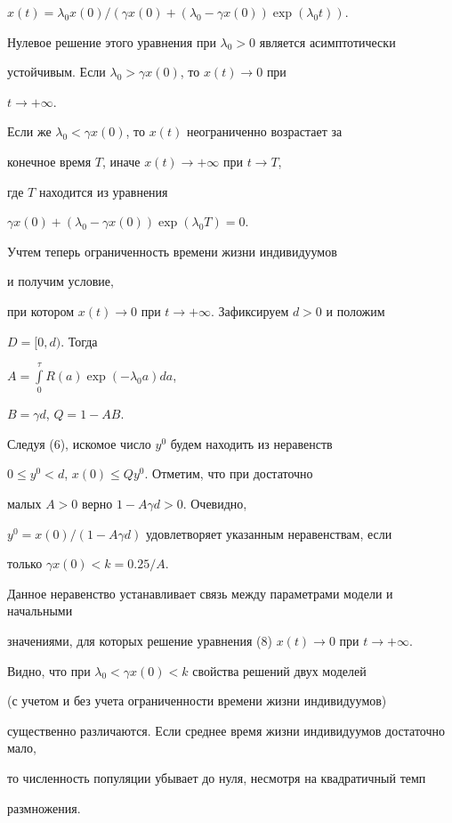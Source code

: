 $x(t)= \lambda_0 x(0)/(\gamma x(0) + (\lambda_0 - \gamma x(0))


\exp(\lambda_0 t))$.


Нулевое решение этого уравнения при $\lambda_0 > 0$ является асимптотически


устойчивым. Если $\lambda_0 > \gamma x(0)$, то $x(t) \to 0$ при


$t \to +\infty$.


Если же $\lambda_0 < \gamma x(0)$, то $x(t)$ неограниченно возрастает за


конечное время $T$, иначе $x(t) \to +\infty$ при $t \to T$,


где $T$ находится из уравнения


$\gamma x(0) + (\lambda_0 - \gamma x(0)) \exp(\lambda_0 T) = 0$.


Учтем теперь ограниченность времени жизни ин\-ди\-ви\-ду\-умов


и получим условие,


при котором $x(t) \to 0$ при $t \to +\infty$. Зафиксируем $d>0$ и положим


$D=[0,d)$. Тогда


$A=\int\limits_0^{\tau} R(a) \exp(-\lambda_0 a)da$,


$B=\gamma d$, $Q=1-AB$.


Следуя (6), искомое число $y^0$ будем находить из неравенств


$0 \le y^0 < d$, $x(0) \le Qy^0$. Отметим, что при достаточно


малых $A>0$ верно $1-A \gamma d >0$. Очевидно,


$y^0 = x(0)/(1-A \gamma d)$ удовлетворяет указанным неравенствам, если


только $\gamma x(0) < k = 0.25/A$.


Данное неравенство устанавливает связь между параметрами модели и начальными


значениями, для которых решение уравнения (8) $x(t)\to 0$ при $t\to +\infty$.


Видно, что при $\lambda_0 < \gamma x(0) < k$ свойства решений двух моделей


(с учетом и без учета ограниченности времени жизни индивидуумов)


существенно различаются. Если среднее время жизни индивидуумов достаточно мало,


то численность популяции убывает до нуля, несмотря на квадратичный темп


размножения.


\medskip





